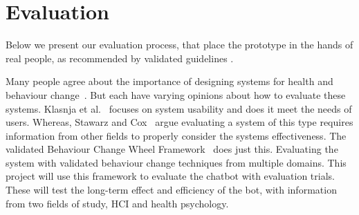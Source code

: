 
\newpage
\section{Evaluation}
Below we present our evaluation process, that place the prototype in the hands of real people, as recommended by validated guidelines \cite{article_mhealth, how_to_evaluate_tech_for_behaviour_change}.

Many people agree about the importance of designing systems for health and behaviour
change~\cite{article_mhealth, article_designing_for_healthy_lifestyles, article_designing_for_health_behaviour_change_hci}.
But each have varying opinions about how to evaluate these systems. Klasnja et al.~\cite{article_evaluate_tech_health_behaviour_change} focuses on system usability and does it meet the needs of users.
Whereas, Stawarz and Cox~\cite{article_designing_for_health_behaviour_change_hci} argue evaluating a system of this type requires information from other fields
to properly consider the systems effectiveness. The validated Behaviour Change Wheel Framework~\cite{article_behaviour_change_wheel} does just this.
Evaluating the system with validated behaviour change techniques from multiple domains. This project will use this framework to evaluate the chatbot with evaluation trials.
These will test the long-term effect and efficiency of the bot, with information from two fields of study, HCI and health psychology.

